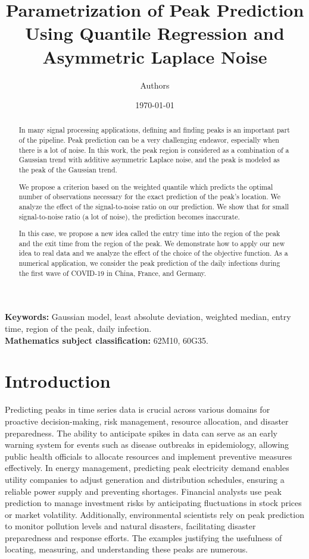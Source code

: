 \documentclass[12pt,a4paper]{article}
\title{\textbf{Parametrization of Peak Prediction Using Quantile Regression and Asymmetric Laplace Noise}}
\author{Authors}
\date{\today}
\begin{document}
	\maketitle
	\begin{abstract}
		\noindent In many signal processing applications, defining and finding peaks is an important part of the pipeline. Peak prediction can be a very challenging endeavor, especially when there is a lot of noise. In this work, the peak region is considered as a combination of a Gaussian trend with additive asymmetric Laplace noise, and the peak is modeled as the peak of the Gaussian trend. 
		
		We propose a criterion based on the weighted quantile which predicts the optimal number of observations necessary for the exact prediction of the peak's location. We analyze the effect of the signal-to-noise ratio on our prediction. We show that for small signal-to-noise ratio (a lot of noise), the prediction becomes inaccurate. 
		
		In this case, we propose a new idea called the entry time into the region of the peak and the exit time from the region of the peak. We demonstrate how to apply our new idea to real data and we analyze the effect of the choice of the objective function.
		As a numerical application, we consider the peak prediction of the daily infections during the first wave of COVID-19 in China, France, and Germany.
	\end{abstract}
	
	\noindent
	\textbf{Keywords:} Gaussian model, least absolute deviation, weighted median, entry time, region of the peak, daily infection.\\
	
	\noindent
	\textbf{Mathematics subject classification:} 62M10, 60G35.
	\section{Introduction} \label{section:1}
	Predicting peaks in time series data is crucial across various domains for proactive decision-making, risk management, resource allocation, and disaster preparedness. The ability to anticipate spikes in data can serve as an early warning system for events such as disease outbreaks in epidemiology, allowing public health officials to allocate resources and implement preventive measures effectively. In energy management, predicting peak electricity demand enables utility companies to adjust generation and distribution schedules, ensuring a reliable power supply and preventing shortages. Financial analysts use peak prediction to manage investment risks by anticipating fluctuations in stock prices or market volatility. Additionally, environmental scientists rely on peak prediction to monitor pollution levels and natural disasters, facilitating disaster preparedness and response efforts. The examples justifying the usefulness of locating, measuring, and understanding these peaks are numerous.
	
\end{document}
